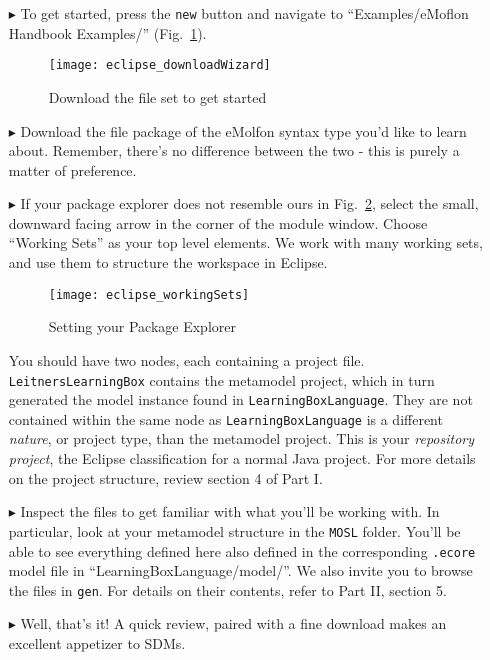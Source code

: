 \begin{itemize}

\item[$\blacktriangleright$] To get started, press the \texttt{new} button and navigate to ``Examples/eMoflon Handbook Examples/''
(Fig.~\ref{fig:downloadWizard}).

\begin{figure}[htbp]
	\centering
  \texttt{[image: eclipse\_downloadWizard]}
	\caption{Download the file set to get started}
	\label{fig:downloadWizard}
\end{figure}
\FloatBarrier

\item[$\blacktriangleright$] Download the file package of the eMolfon syntax type you'd like to learn about. Remember, there's no difference between the
two - this is purely a matter of preference.

\item[$\blacktriangleright$] If your package explorer does not resemble ours in Fig.~\ref{fig:workingSets}, select the small, downward facing arrow in the
corner of the module window. Choose ``Working Sets'' as your top level elements. We work with many working sets, and use them to structure the workspace in 
Eclipse.

\begin{figure}[htbp]
	\centering
  \texttt{[image: eclipse\_workingSets]}
	\caption{Setting your Package Explorer}
	\label{fig:workingSets}
\end{figure}
\FloatBarrier


You should have two nodes, each containing a project file. \texttt{LeitnersLearningBox} contains the metamodel project, which in turn generated the model
instance found in \texttt{LearningBoxLanguage}. They are not contained within the same node as \texttt{LearningBoxLanguage} is a different \emph{nature}, or
project type, than the metamodel project. This is your \emph{repository project}, the Eclipse classification for a normal Java project. For more details on
the project structure, review section 4 of Part I.

\item[$\blacktriangleright$] Inspect the files to get familiar with what you'll be working with. In particular, look at your metamodel structure in the
\texttt{MOSL} folder. You'll be able to see everything defined here also defined in the corresponding \texttt{.ecore} model file in
``LearningBoxLanguage/model/''. We also invite you to browse the files in \texttt{gen}. For details on their contents, refer to Part II, section 5.

\item[$\blacktriangleright$] Well, that's it! A quick review, paired with a fine download makes an excellent appetizer to SDMs. 

\end{itemize}
